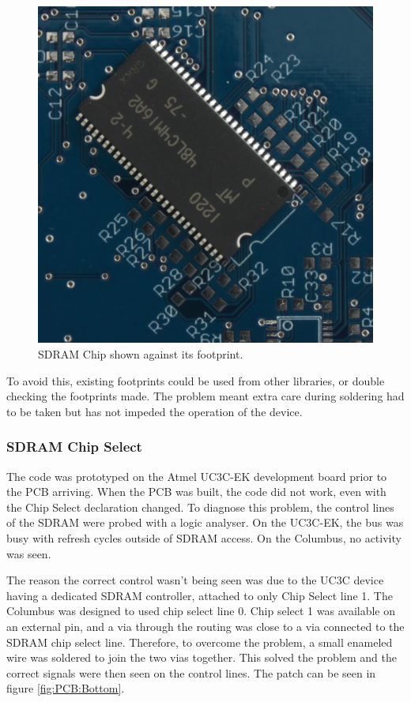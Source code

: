 \begin{figure}
\centering
\includegraphics[width=\textwidth / 2]{./Figures/PCB_SDRAM.jpg}
\caption{SDRAM Chip shown against its footprint.}
\label{fig:SDRAM_Err}
\end{figure}

To avoid this, existing footprints could be used from other libraries, or double checking the footprints made. The problem meant extra care during soldering had to be taken but has not impeded the operation of the device. 

\subsubsection{SDRAM Chip Select}
The code was prototyped on the Atmel UC3C-EK development board prior to the PCB arriving. When the PCB was built, the code did not work, even with the Chip Select declaration changed. To diagnose this problem, the control lines of the SDRAM were probed with a logic analyser. On the UC3C-EK, the bus was busy with refresh cycles outside of SDRAM access. On the Columbus, no activity was seen. 

The reason the correct control wasn't being seen was due to the UC3C device having a dedicated SDRAM controller, attached to only Chip Select line 1. The Columbus was designed to used chip select line 0. Chip select 1 was available on an external pin, and a via through the routing was close to a via connected to the SDRAM chip select line. Therefore, to overcome the problem, a small enameled wire was soldered to join the two vias together. This solved the problem and the correct signals were then seen on the control lines. The patch can be seen in figure \ref{fig:PCB:Bottom}. 

